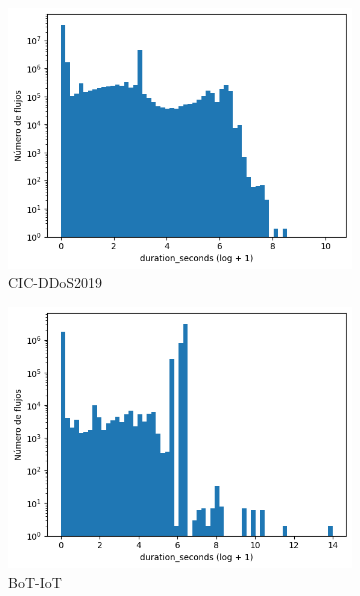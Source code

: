 \begin{figure}[H]
    \centering
    \begin{subfigure}[b]{0.32\textwidth}
        \centering
        \includegraphics[width=\textwidth]{media/packet_pincer_cicddos/duration_seconds_log_x_log_y.png}
        \caption{CIC-DDoS2019}
    \end{subfigure}
    \hfill
    \begin{subfigure}[b]{0.32\textwidth}
        \centering
        \includegraphics[width=\linewidth]{media/packet_pincer_botiot/duration_seconds_log_x_log_y.png}
        \caption{BoT-IoT}
    \end{subfigure}
    \hfill
    \begin{subfigure}[b]{0.32\textwidth}

\end{subfigure}
\end{figure}
